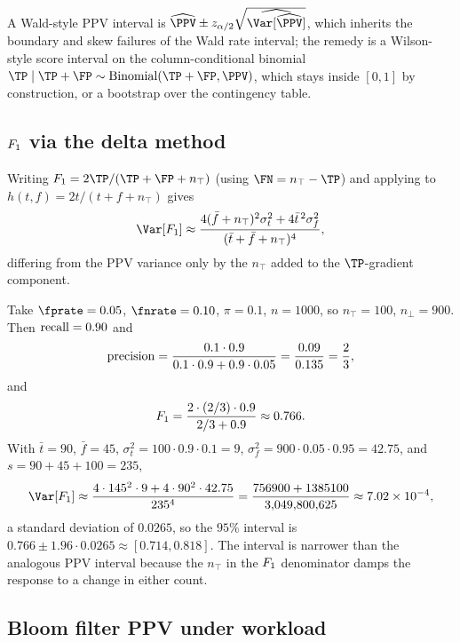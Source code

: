 A Wald-style PPV interval is $\widehat{\PPV} \pm z_{\alpha/2}
\sqrt{\widehat{\Var[\widehat{\PPV}]}}$, which inherits the boundary and skew
failures of the Wald rate interval; the remedy is a Wilson-style score
interval on the column-conditional binomial $\TP \mid \TP + \FP \sim
\mathrm{Binomial}(\TP + \FP, \PPV)$, which stays inside $[0,1]$ by
construction, or a bootstrap over the contingency table.

\subsection*{$F_1$ via the delta method}

Writing $\Fone = 2\TP/(\TP + \FP + n_\top)$ (using $\FN = n_\top - \TP$) and
applying  to $h(t, f) = 2t/(t + f + n_\top)$ gives
\[
  \Var[\Fone] \approx
  \frac{4(\bar f + n_\top)^2\sigma_t^2 + 4\bar t^{\,2}\sigma_f^2}{(\bar t + \bar f + n_\top)^4},
\]
differing from the PPV variance only by the $n_\top$ added to the
$\TP$-gradient component.

\begin{example}
\label{ex:f1-delta}
Take $\fprate = 0.05$, $\fnrate = 0.10$, $\pi = 0.1$, $n = 1000$, so
$n_\top = 100$, $n_\bot = 900$. Then $\mathrm{recall} = 0.90$ and
\[
  \mathrm{precision} = \frac{0.1 \cdot 0.9}{0.1 \cdot 0.9 + 0.9 \cdot 0.05}
  = \frac{0.09}{0.135} = \frac{2}{3},
\]
and
\[
  F_1 = \frac{2 \cdot (2/3) \cdot 0.9}{2/3 + 0.9} \approx 0.766.
\]
With $\bar t = 90$, $\bar f = 45$, $\sigma_t^2 = 100 \cdot 0.9 \cdot 0.1 = 9$,
$\sigma_f^2 = 900 \cdot 0.05 \cdot 0.95 = 42.75$, and $s = 90 + 45 + 100 =
235$,
\[
  \Var[\Fone] \approx
  \frac{4 \cdot 145^2 \cdot 9 + 4 \cdot 90^2 \cdot 42.75}{235^4}
  = \frac{756900 + 1385100}{3{,}049{,}800{,}625}
  \approx 7.02 \times 10^{-4},
\]
a standard deviation of $0.0265$, so the $95\%$ interval is $0.766 \pm 1.96
\cdot 0.0265 \approx [0.714, 0.818]$. The interval is narrower than the
analogous PPV interval because the $n_\top$ in the $F_1$ denominator damps
the response to a change in either count.
\end{example}

\subsection*{Bloom filter PPV under workload}

